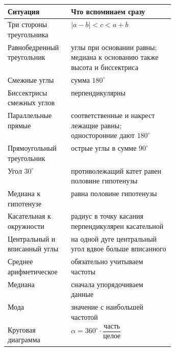 \documentclass[a4paper,12pt]{article}
\begin{document}
\begin{center}
\begin{tabularx}{\linewidth}{@{}p{0.38\linewidth}X@{}}
\toprule
\textbf{Ситуация} & \textbf{Что вспоминаем сразу} \\
\midrule
Три стороны треугольника
&
$|a-b|<c<a+b$
\\

Равнобедренный треугольник
&
углы при основании равны; медиана к основанию также высота и биссектриса
\\

Смежные углы
&
сумма $180^\circ$
\\

Биссектрисы смежных углов
&
перпендикулярны
\\

Параллельные прямые
&
соответственные и накрест лежащие равны; односторонние дают $180^\circ$
\\

Прямоугольный треугольник
&
острые углы в сумме $90^\circ$
\\

Угол $30^\circ$
&
противолежащий катет равен половине гипотенузы
\\

Медиана к гипотенузе
&
равна половине гипотенузы
\\

Касательная к окружности
&
радиус в точку касания перпендикулярен касательной
\\

Центральный и вписанный углы
&
на одной дуге центральный угол вдвое больше вписанного
\\

Среднее арифметическое
&
обязательно учитываем частоты
\\

Медиана
&
сначала упорядочиваем данные
\\

Мода
&
значение с наибольшей частотой
\\

Круговая диаграмма
&
$\alpha=360^\circ\cdot\dfrac{\text{часть}}{\text{целое}}$
\\
\bottomrule
\end{tabularx}
\end{center}

\clearpage
\end{document}
